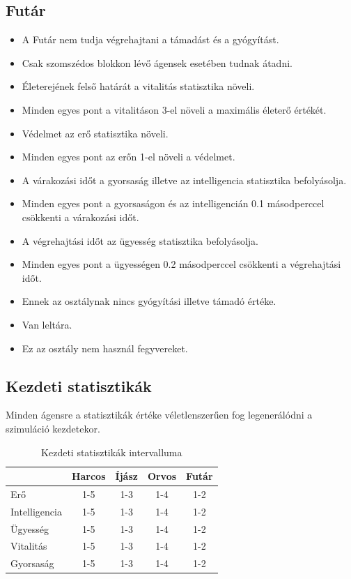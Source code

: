\subsection{Futár}
\begin{itemize}
\item A Futár nem tudja végrehajtani a támadást és a gyógyítást.
\item Csak szomszédos blokkon lévő ágensek esetében tudnak átadni.
\item Életerejének felső határát a vitalitás statisztika növeli.
\item Minden egyes pont a vitalitáson 3-el növeli a maximális életerő értékét.
\item Védelmet az erő statisztika növeli.
\item Minden egyes pont az erőn 1-el növeli a védelmet.
\item A várakozási időt a gyorsaság illetve az intelligencia statisztika befolyásolja.
\item Minden egyes pont a gyorsaságon és az intelligencián 0.1 másodperccel csökkenti a várakozási időt.
\item A végrehajtási időt az ügyesség statisztika befolyásolja.
\item Minden egyes pont a ügyességen 0.2 másodperccel csökkenti a végrehajtási időt.
\item Ennek az osztálynak nincs gyógyítási illetve támadó értéke.
\item Van leltára.
\item Ez az osztály nem használ fegyvereket.
\end{itemize}

\subsection{Kezdeti statisztikák}

Minden ágensre a statisztikák értéke véletlenszerűen fog legenerálódni a szimuláció kezdetekor.

\begin{table}[!ht]
\centering
\caption{Kezdeti statisztikák intervalluma}
\label{tab:table1}
\begin{tabular}{|l|c|c|c|c|}
\hline
 & Harcos & Íjász & Orvos & Futár \\
\hline
Erő & 1-5 & 1-3 & 1-4 & 1-2  \\
\hline
Intelligencia & 1-5 & 1-3 & 1-4 & 1-2  \\
\hline
Ügyesség & 1-5 & 1-3 & 1-4 & 1-2 \\
\hline
Vitalitás & 1-5 & 1-3 & 1-4 & 1-2 \\
\hline
Gyorsaság & 1-5 & 1-3 & 1-4 &1-2 \\
\hline
\end{tabular}
\end{table}

